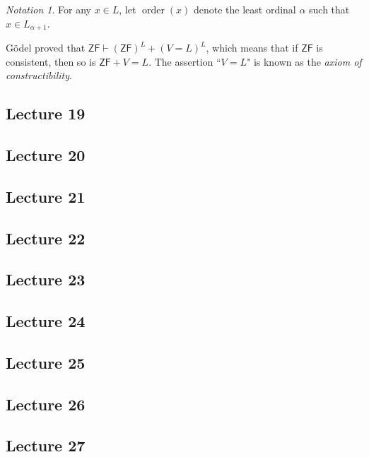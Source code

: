 \documentclass[10pt,letterpaper,cm]{nupset}
\theoremstyle{definition}
\theoremstyle{theorem}
\theoremstyle{remark}
\newtheorem*{notation}{Notation}
\newcommand{\1}{\mathbf{1}}
\newcommand{\0}{\vec 0}
\newcommand{\zf}{\mathsf{ZF}}
\DeclareMathOperator{\order}{order}
\begin{document}
\begin{notation}
For any $x\in L$, let $\order(x)$ denote the least ordinal $\alpha$ such that $x\in L_{\alpha +1}$.
\end{notation}

\smallskip

G\"odel proved that $\zf \vdash \left(\zf\right)^L + \left(V=L\right)^L$, which means that if $\zf$ is consistent, then so is $\zf + {V=L}$. The assertion ``$V=L$" is known as the \textit{axiom of constructibility}.

\subsection{Lecture 19}

\subsection{Lecture 20}

\subsection{Lecture 21}

\subsection{Lecture 22}

\subsection{Lecture 23}

\subsection{Lecture 24}

\subsection{Lecture 25}

\subsection{Lecture 26}

\subsection{Lecture 27}
\end{document}
